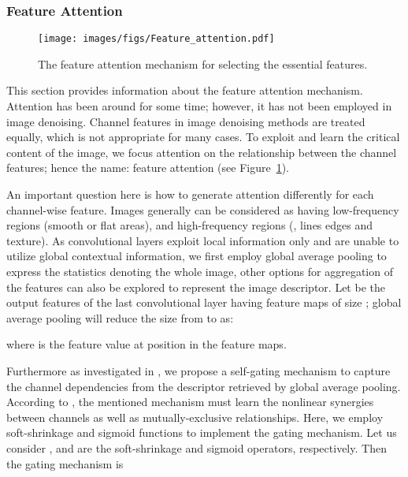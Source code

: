 \documentclass[10pt,twocolumn,letterpaper]{article}
\begin{document}
\subsubsection{Feature Attention}
\begin{figure}
\begin{center}
\texttt{[image: images/figs/Feature\_attention.pdf]}\\ 
\end{center}
\caption {The feature attention mechanism for selecting the essential features.}
\label{fig:net_eam}
\end{figure}

This section provides information about the feature attention mechanism. Attention \cite{xu2015show} has been around for some time; however, it has not been employed in image denoising. Channel features in image denoising methods are treated equally, which is not appropriate for many cases.  To exploit and learn the critical content of the image, we focus  attention on the relationship between the channel features; hence the name: feature attention (see Figure~\ref{fig:net_eam}).

An important question here is how to generate attention differently for each channel-wise feature. Images generally can be considered as having low-frequency regions (smooth or flat areas), and high-frequency regions (\eg, lines edges and texture). As convolutional layers exploit local information only and are unable to utilize global contextual information, we first employ global average pooling to express the statistics denoting the whole image, other options for aggregation of the features can also be explored to represent the image descriptor. Let  be the output features of the last convolutional layer having  feature maps of size ; global average pooling will reduce the size from  to  as:


where  is the feature value at position  in the feature maps. 

Furthermore as investigated in \cite{hu2018squeeze}, we propose a self-gating mechanism to capture the channel dependencies from the descriptor retrieved by  global average pooling. According to \cite{hu2018squeeze}, the mentioned mechanism must learn the nonlinear synergies between channels as well as mutually-exclusive relationships. Here, we employ soft-shrinkage and sigmoid functions to implement the gating mechanism. Let us consider , and  are the soft-shrinkage and sigmoid operators, respectively. Then the gating mechanism is 
\end{document}
